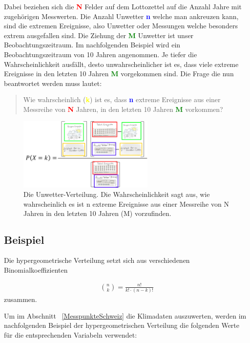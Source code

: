 \begin{refsection}
Dabei beziehen sich die \textcolor{red}{\textbf{N}} Felder auf dem Lottozettel auf die Anzahl Jahre mit zugehörigen Messwerten. Die Anzahl Unwetter \textcolor{blue}{\textbf{n}} welche man ankreuzen kann, sind die extremen Ereignisse, also Unwetter oder Messungen welche besonders extrem ausgefallen sind. Die Ziehung der \textcolor{green}{\textbf{M}} Unwetter ist unser Beobachtungszeitraum. Im nachfolgenden Beispiel wird ein Beobachtungszeitraum von 10 Jahren angenommen. Je tiefer die Wahrscheinlichkeit ausfällt, desto unwahrscheinlicher ist es, dass viele extreme Ereignisse in den letzten 10 Jahren \textcolor{green}{\textbf{M}} vorgekommen sind. Die Frage die nun beantwortet werden muss lautet:

\begin{quote}
Wie wahrscheinlich (\textcolor{yellow}{\textbf{k}}) ist es, dass \textcolor{blue}{\textbf{n}} extreme Ereignisse aus einer Messreihe von \textcolor{red}{\textbf{N}} Jahren, in den letzten 10 Jahren \textcolor{green}{\textbf{M}} vorkommen? 
\end{quote}

\begin{figure}
\centering
\includegraphics[width=0.6\textwidth]{extrem/Unwettervert.pdf}
\caption{Die Unwetter-Verteilung. Die Wahrscheinlichkeit sagt aus, wie wahrscheinlich es ist n extreme Ereignisse aus einer Messreihe von N Jahren in den letzten 10 Jahren (M) vorzufinden.}
\label{UnwetterVerteilung}
\end{figure}


\subsection{Beispiel} \label{Beispiel}
Die hypergeometrische Verteilung setzt sich aus verschiedenen Binomialkoeffizienten

\begin{align*}
\binom{n}{k} = \frac {n!}{k! \cdot (n-k)!} 
\end{align*}
zusammen.

Um im Abschnitt ~\ref{MesspunkteSchweiz} die Klimadaten auszuwerten, werden im nachfolgenden Beispiel der hypergeometrischen Verteilung die folgenden Werte für die entsprechenden Variabeln verwendet:


\end{refsection}
